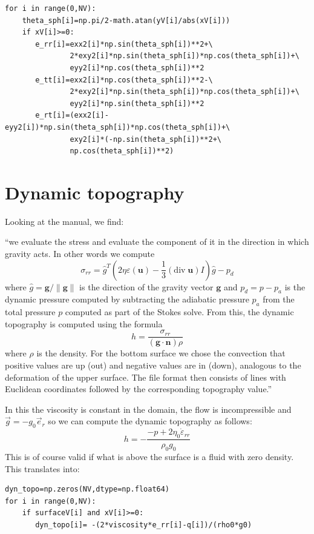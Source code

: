 \begin{lstlisting}
for i in range(0,NV):
    theta_sph[i]=np.pi/2-math.atan(yV[i]/abs(xV[i]))
    if xV[i]>=0:
       e_rr[i]=exx2[i]*np.sin(theta_sph[i])**2+\
               2*exy2[i]*np.sin(theta_sph[i])*np.cos(theta_sph[i])+\
               eyy2[i]*np.cos(theta_sph[i])**2
       e_tt[i]=exx2[i]*np.cos(theta_sph[i])**2-\
               2*exy2[i]*np.sin(theta_sph[i])*np.cos(theta_sph[i])+\
               eyy2[i]*np.sin(theta_sph[i])**2
       e_rt[i]=(exx2[i]-eyy2[i])*np.sin(theta_sph[i])*np.cos(theta_sph[i])+\
               exy2[i]*(-np.sin(theta_sph[i])**2+\
               np.cos(theta_sph[i])**2)
\end{lstlisting}




\section*{Dynamic topography}

Looking at the \aspect manual, we find:

``we evaluate the stress and evaluate the component of it in the direction in which 
gravity acts. In other words we compute 
\[
\sigma_{rr}={\hat g}^T (2 \eta \varepsilon(\mathbf u)
- \frac 13 (\textrm{div}\;\mathbf u)I)\hat g - p_d
\] 
where 
$\hat g = \mathbf g/\|\mathbf g\|$ is the direction of 
the gravity vector $\mathbf g$ and $p_d=p-p_a$ is the dynamic 
pressure computed by subtracting the adiabatic pressure $p_a$ 
from the total pressure $p$ computed as part of the Stokes 
solve. From this, the dynamic 
topography is computed using the formula 
\[
h=\frac{\sigma_{rr}}{(\mathbf g \cdot \mathbf n)  \rho}
\] 
where $\rho$ is the density. For the bottom surface we chose the convection 
that positive values are up (out) and negative values are in (down), analogous to 
the deformation of the upper surface. 
The file format then consists of lines with Euclidean coordinates 
followed by the corresponding topography value.''

In this \stone the viscosity is constant in the domain, the flow 
is incompressible and $\vec{g}= -g_0 \vec{e}_r$ so we can compute the 
dynamic topography as follows:
\[
h = - \frac{-p + 2 \eta_0 \dot{\varepsilon}_{rr} }{\rho_0 g_0}
\]
This is of course valid if what is above the surface is a fluid with zero density.
This translates into:

\begin{lstlisting}
dyn_topo=np.zeros(NV,dtype=np.float64)
for i in range(0,NV):
    if surfaceV[i] and xV[i]>=0:
       dyn_topo[i]= -(2*viscosity*e_rr[i]-q[i])/(rho0*g0) 
\end{lstlisting}

